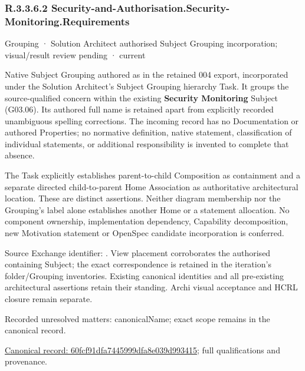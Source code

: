 \subsubsection*{R.3.3.6.2 Security-and-Authorisation.Security-Monitoring.Requirements}
\label{navigation:R.3.3.6.2}

\label{element:60fcf91dfa7445999dfa8e039d993415}
{\small Grouping · Solution Architect authorised Subject Grouping incorporation; visual/result review pending · current}\par

Native Subject Grouping authored as \texttt{} in the retained 004 export,
incorporated under the Solution Architect's Subject Grouping hierarchy Task.
It groups the source-qualified \texttt{} concern within
the existing \textbf{Security Monitoring} Subject (G03.06). Its authored full name
is retained apart from explicitly recorded unambiguous spelling corrections.
The incoming record has no Documentation or authored Properties; no normative
definition, native statement, classification of individual statements, or
additional responsibility is invented to complete that absence.



The Task explicitly establishes parent-to-child Composition as containment and
a separate directed child-to-parent Home Association as authoritative architectural
location. These are distinct assertions. Neither diagram membership nor the
Grouping's label alone establishes another Home or a statement allocation.
No component ownership, implementation dependency, Capability decomposition,
new Motivation statement or OpenSpec candidate incorporation is conferred.



Source Exchange identifier: \texttt{}. View placement corroborates
the authorised containing Subject; the exact correspondence is retained in the
iteration's folder/Grouping inventories. Existing canonical identities and all
pre-existing architectural assertions retain their standing. Archi visual
acceptance and HCRL closure remain separate.


{\small Recorded unresolved matters: canonicalName; exact scope remains in the canonical record.}\par
{\footnotesize \href{../../../../continuum/grouping/60fcf91dfa7445999dfa8e039d993415.md}{Canonical record: 60fcf91dfa7445999dfa8e039d993415}; full qualifications and provenance.}\par
